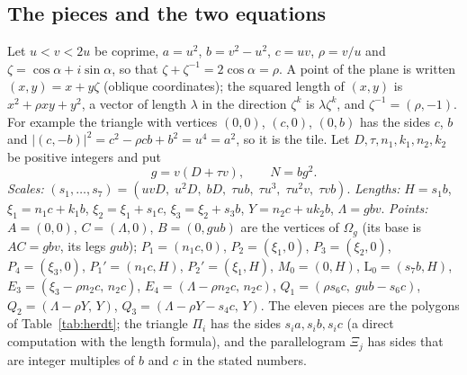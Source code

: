 \documentclass[11pt,reqno]{amsart}
\theoremstyle{plain}
\theoremstyle{definition}
\begin{document}
\subsection{The pieces and the two equations}\label{sub:herdtpieces}
Let $u<v<2u$ be coprime, $a=u^2$, $b=v^2-u^2$, $c=uv$, $\rho=v/u$ and $\zeta=\cos\alpha+i\sin\alpha$, so that $\zeta+\zeta^{-1}=2\cos\alpha=\rho$. A point of the plane is written $(x,y)=x+y\zeta$ (oblique coordinates); the
squared length of $(x,y)$ is $x^2+\rho xy+y^2$, a vector of length $\lambda$ in the direction $\zeta^k$ is $\lambda \zeta^k$, and $\zeta^{-1}=(\rho,-1)$. For example the triangle with vertices $(0,0)$, $(c,0)$, $(0,b)$ has the sides $c$, $b$ and
$|(c,-b)|^2=c^2-\rho cb+b^2=u^4=a^2$, so it is the tile.
Let $D,\tau,n_1,k_1,n_2,k_2$ be positive integers and put
\[
g=v(D+\tau v),\qquad N=bg^2 .
\]
\emph{Scales:} $(s_1,\dots,s_7)=(uvD,\;u^2D,\;bD,\;\tau ub,\;\tau u^3,\;\tau u^2v,\;\tau vb)$.
\emph{Lengths:} $H=s_1b$, $\xi_1=n_1c+k_1b$, $\xi_2=\xi_1+s_1c$, $\xi_3=\xi_2+s_3b$, $Y=n_2c+uk_2b$, $\Lambda=gbv$.
\emph{Points:} $A=(0,0)$, $C=(\Lambda,0)$, $B=(0,gub)$ are the vertices of $\Omega_{g}$ (its base is $AC=gbv$, its legs $gub$);
$P_1=(n_1c,0)$, $P_2=(\xi_1,0)$, $P_3=(\xi_2,0)$, $P_4=(\xi_3,0)$, $P_1'=(n_1c,H)$, $P_2'=(\xi_1,H)$, $M_0=(0,H)$, $\mathrm{L}_0=(s_7b,H)$,
$E_3=(\xi_3-\rho n_2c,\,n_2c)$, $E_4=(\Lambda-\rho n_2c,\,n_2c)$, $Q_1=(\rho s_6c,\;gub-s_6c)$, $Q_2=(\Lambda-\rho Y,\,Y)$, $Q_3=(\Lambda-\rho Y-s_4c,\,Y)$.
The eleven pieces are the polygons of Table~\ref{tab:herdt}; the triangle $\Pi_i$ has the sides $s_ia,s_ib,s_ic$ (a direct computation with the length formula), and the parallelogram $\Xi_j$ has sides that are
integer multiples of $b$ and $c$ in the stated numbers.
\end{document}
